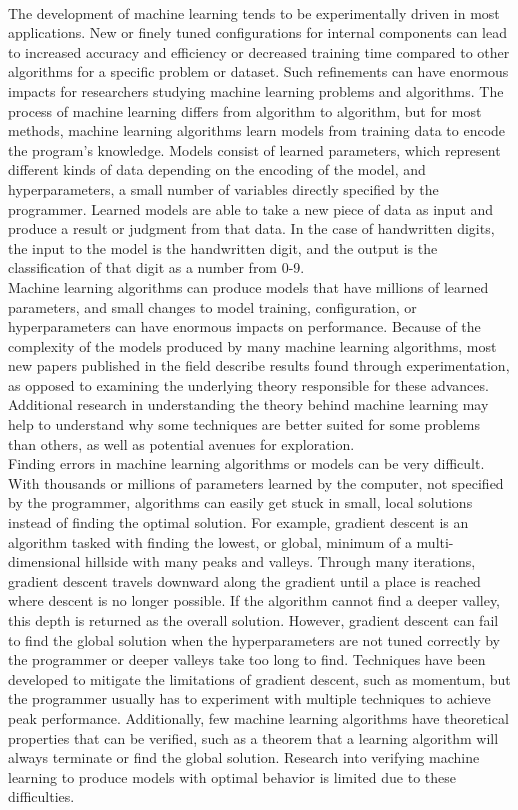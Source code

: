 \\The development of machine learning tends to be experimentally driven in most applications. New or finely tuned configurations for internal components can lead to increased accuracy and efficiency or decreased training time compared to other algorithms for a specific problem or dataset. Such refinements can have enormous impacts for researchers studying machine learning problems and algorithms. The process of machine learning differs from algorithm to algorithm, but for most methods, machine learning algorithms learn models from training data to encode the program's knowledge. Models consist of learned parameters, which represent different kinds of data depending on the encoding of the model, and hyperparameters, a small number of variables directly specified by the programmer. Learned models are able to take a new piece of data as input and produce a result or judgment from that data. In the case of handwritten digits, the input to the model is the handwritten digit, and the output is the classification of that digit as a number from 0-9.
\\Machine learning algorithms can produce models that have millions of learned parameters, and small changes to model training, configuration, or hyperparameters can have enormous impacts on performance. Because of the complexity of the models produced by many machine learning algorithms, most new papers published in the field describe results found through experimentation, as opposed to examining the underlying theory responsible for these advances. Additional research in understanding the theory behind machine learning may help to understand why some techniques are better suited for some problems than others, as well as potential avenues for exploration.
\\Finding errors in machine learning algorithms or models can be very difficult. With thousands or millions of parameters learned by the computer, not specified by the programmer, algorithms can easily get stuck in small, local solutions instead of finding the optimal solution. For example, gradient descent is an algorithm tasked with finding the lowest, or global, minimum of a multi-dimensional hillside with many peaks and valleys. Through many iterations, gradient descent travels downward along the gradient until a place is reached where descent is no longer possible. If the algorithm cannot find a deeper valley, this depth is returned as the overall solution. However, gradient descent can fail to find the global solution when the hyperparameters are not tuned correctly by the programmer or deeper valleys take too long to find. Techniques have been developed to mitigate the limitations of gradient descent, such as momentum, but the programmer usually has to experiment with multiple techniques to achieve peak performance. Additionally, few machine learning algorithms have theoretical properties that can be verified, such as a theorem that a learning algorithm will always terminate or find the global solution. Research into verifying machine learning to produce models with optimal behavior is limited due to these difficulties.
